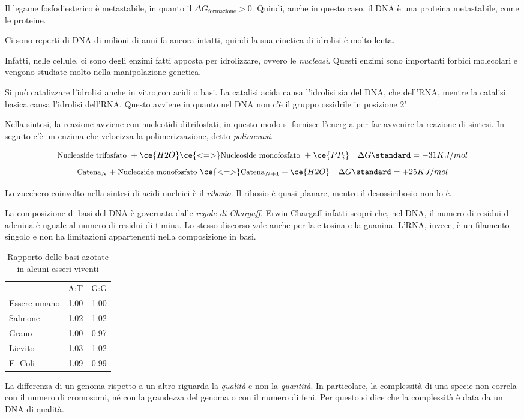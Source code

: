 Il legame fosfodiesterico è metastabile, in quanto il $\Delta G_{\text{formazione}} > 0$. Quindi, anche in questo caso, il DNA è una proteina metastabile, come le proteine.

Ci sono reperti di DNA di milioni di anni fa ancora intatti, quindi la sua cinetica di idrolisi è molto lenta.

Infatti, nelle cellule, ci sono degli enzimi fatti apposta per idrolizzare, ovvero le \emph{nucleasi}. Questi enzimi sono importanti forbici molecolari e vengono studiate molto nella manipolazione genetica.

Si può catalizzare l'idrolisi anche in vitro,con acidi o basi. La catalisi acida causa l'idrolisi sia del DNA, che dell’RNA, mentre la catalisi basica causa l'idrolisi dell'RNA. Questo avviene in quanto nel DNA non c'è il gruppo ossidrile in posizione 2'


Nella sintesi, la reazione avviene con nucleotidi ditrifosfati; in questo modo si fornisce l'energia per far avvenire la reazione di sintesi. In seguito c'è un enzima che velocizza la polimerizzazione, detto \emph{polimerasi}.

\[
\text{\small Nucleoside trifosfato } + \ce{H2O} \ce{<=>} \text{\small Nucleoside monofosfato } + \ce{PP_{i}} \quad \Delta G\standard = -31 KJ/mol
\]
\[
\text{\small Catena}_N + \text{\small Nucleoside monofosfato } \ce{<=>} \text{\small Catena}_{N+1} + \ce{H2O} \quad \Delta G\standard = +25 KJ/mol
\]

Lo zucchero coinvolto nella sintesi di acidi nucleici è il \emph{ribosio}. Il ribosio è quasi planare, mentre il desossiribosio non lo è.


La composizione di basi del DNA è governata dalle \emph{regole di Chargaff}.
Erwin Chargaff infatti scoprì che, nel DNA, il numero di residui di adenina è uguale al numero di residui di timina. Lo stesso discorso vale anche per la citosina e la guanina.
L'RNA, invece, è un filamento singolo e non ha limitazioni appartenenti nella composizione in basi.

\begin{table}[h]
\begin{tabular}{lcc}
& A:T & G:G \\
Essere umano & 1.00 & 1.00 \\
Salmone & 1.02 & 1.02 \\
Grano & 1.00 & 0.97 \\
Lievito & 1.03 & 1.02 \\
E. Coli & 1.09 & 0.99 \\
\end{tabular}
\caption{Rapporto delle basi azotate in alcuni esseri viventi}
\end{table}

La differenza di un genoma rispetto a un altro riguarda la \emph{qualità} e non la \emph{quantità}. In particolare, la complessità di una specie non correla con il numero di cromosomi, né con la grandezza del genoma o con il numero di feni. Per questo si dice che la complessità è data da un DNA di qualità.